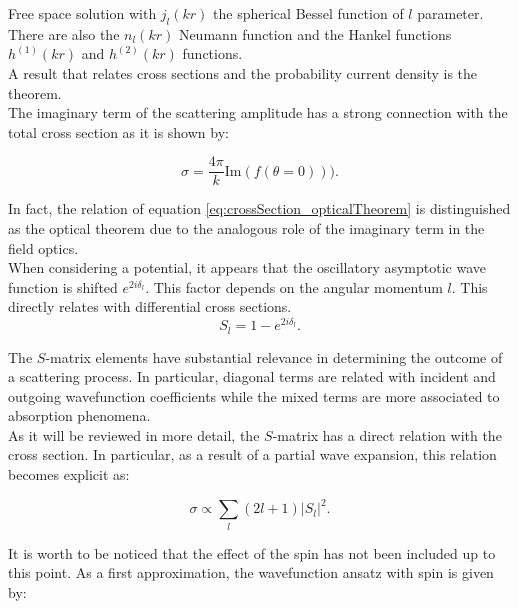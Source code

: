 \documentclass[openany]{book}
\begin{document}
Free space solution with $j_l(kr)$ the spherical Bessel function of $l$ parameter. There are also the $n_l(kr)$ Neumann function and the Hankel functions $h^{(1)}(kr)$ and $h^{(2)}(kr)$ functions. \\

A result that relates cross sections and the probability current density is the theorem. \\

The imaginary term of the scattering amplitude has a strong connection with the total cross section as it is shown by: 

\begin{equation}  \label{eq:crossSection_opticalTheorem}
	\sigma = \frac{4 \pi }{k} \mathrm{Im}(f(\theta = 0))).
\end{equation}

In fact, the relation of equation \ref{eq:crossSection_opticalTheorem} is distinguished as the optical theorem due to the analogous role of the imaginary term in the field optics. \\

When considering a potential, it appears that the oscillatory asymptotic wave function is shifted $e^{2i\delta_l}$. This factor depends on the angular momentum $l$. This directly relates with differential cross sections. \\

\begin{equation}  \label{eq:crossSection_Smatrix_definition}
	S_l = 1 - e^{2i\delta_l}.
\end{equation}

The $S$-matrix elements have substantial relevance in determining the outcome of a scattering process. In particular, diagonal terms are related with incident and outgoing wavefunction coefficients while the mixed terms are more associated to absorption phenomena. \\

As it will be reviewed in more detail, the $S$-matrix has a direct relation with the cross section. In particular, as a result of a partial wave expansion, this relation becomes explicit as:

\begin{equation}  \label{eq:crossSection_Smatrix_relation}
	\sigma \propto \sum_{l} (2l + 1) |S_l|^2. 
\end{equation}

It is worth to be noticed that the effect of the spin has not been included up to this point. As a first approximation, the 
wavefunction ansatz with spin is given by:
\end{document}
